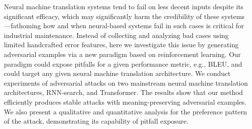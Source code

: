 Neural machine translation systems tend to fail on less decent inputs despite its significant efficacy, which may significantly harm the credibility of these systems—fathoming how and when neural-based systems fail in such cases is critical for industrial maintenance. Instead of collecting and analyzing bad cases using limited handcrafted error features, here we investigate this issue by generating adversarial examples via a new paradigm based on reinforcement learning. Our paradigm could expose pitfalls for a given performance metric, e.g., BLEU, and could target any given neural machine translation architecture. We conduct experiments of adversarial attacks on two mainstream neural machine translation architectures, RNN-search, and Transformer. The results show that our method efficiently produces stable attacks with meaning-preserving adversarial examples. We also present a qualitative and quantitative analysis for the preference pattern of the attack, demonstrating its capability of pitfall exposure.
